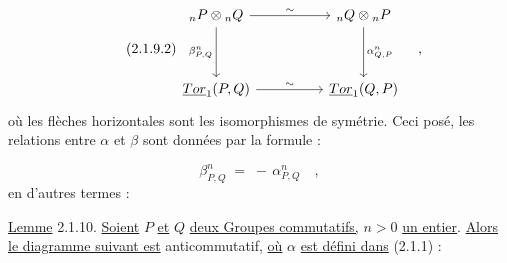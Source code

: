 \begin{equation}\tag{2.1.9.2}
\begin{tikzcd}[column sep=huge, row sep=huge]
{}_nP \otimes {}_nQ \arrow[r, "\sim"] \arrow[d, "{\beta^n_{P,Q}}"'] & {}_nQ \otimes {}_nP \arrow[d, "{\alpha^n_{Q,P}}"] \\
\underline{Tor}_1(P,Q) \arrow[r, "\sim"] & \underline{Tor}_1(Q,P)
\end{tikzcd}\quad ,
\end{equation}
où les flèches horizontales sont les isomorphismes de symétrie. Ceci posé, les relations entre $\alpha$ et $\beta$ sont données par la formule :

\begin{equation}\tag{2.1.9.3}
\beta^n_{P,Q} \;=\; - \,\alpha^n_{P,Q} \quad ,
\end{equation}
en d'autres termes :

\underline{Lemme} 2.1.10. \underline{Soient} $P$ \underline{et} $Q$ \underline{deux Groupes commutatifs,} $n > 0$ \underline{un entier}. \underline{Alors le diagramme suivant est} anticommutatif, \underline{où} $\alpha$ \underline{est défini dans} (2.1.1) :

